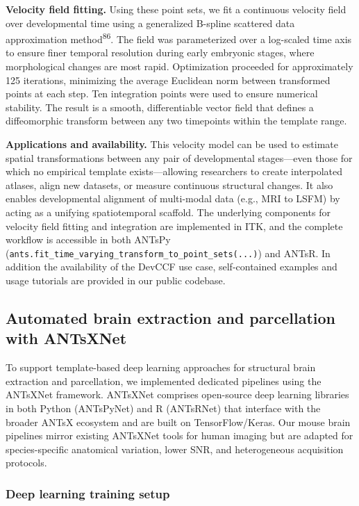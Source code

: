 \documentclass[
  12pt,
]{article}
\begin{document}
\textbf{Velocity field fitting.} Using these point sets, we fit a
continuous velocity field over developmental time using a generalized
B-spline scattered data approximation method\textsuperscript{86}. The
field was parameterized over a log-scaled time axis to ensure finer
temporal resolution during early embryonic stages, where morphological
changes are most rapid. Optimization proceeded for approximately 125
iterations, minimizing the average Euclidean norm between transformed
points at each step. Ten integration points were used to ensure
numerical stability. The result is a smooth, differentiable vector field
that defines a diffeomorphic transform between any two timepoints within
the template range.

\textbf{Applications and availability.} This velocity model can be used
to estimate spatial transformations between any pair of developmental
stages---even those for which no empirical template exists---allowing
researchers to create interpolated atlases, align new datasets, or
measure continuous structural changes. It also enables developmental
alignment of multi-modal data (e.g., MRI to LSFM) by acting as a
unifying spatiotemporal scaffold. The underlying components for velocity
field fitting and integration are implemented in ITK, and the complete
workflow is accessible in both ANTsPy
(\texttt{ants.fit\_time\_varying\_transform\_to\_point\_sets(...)}) and
ANTsR. In addition the availability of the DevCCF use case,
self-contained examples and usage tutorials are provided in our public
codebase.

\subsection{Automated brain extraction and parcellation with
ANTsXNet}\label{automated-brain-extraction-and-parcellation-with-antsxnet}

To support template-based deep learning approaches for structural brain
extraction and parcellation, we implemented dedicated pipelines using
the ANTsXNet framework. ANTsXNet comprises open-source deep learning
libraries in both Python (ANTsPyNet) and R (ANTsRNet) that interface
with the broader ANTsX ecosystem and are built on TensorFlow/Keras. Our
mouse brain pipelines mirror existing ANTsXNet tools for human imaging
but are adapted for species-specific anatomical variation, lower SNR,
and heterogeneous acquisition protocols.

\subsubsection{Deep learning training
setup}\label{deep-learning-training-setup}
\end{document}
